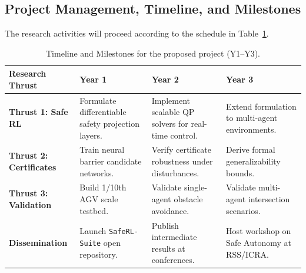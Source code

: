 \subsection{Project Management, Timeline, and Milestones}
The research activities will proceed according to the schedule in Table~\ref{tab:timeline}.

\begin{table}[h]
\setlength{\parindent}{0pt}
\setlength{\parskip}{0pt}
\centering
\caption{Timeline and Milestones for the proposed project (Y1--Y3).}
\label{tab:timeline}
\vspace{0.5em}
\begin{tabularx}{\textwidth}{p{3.8cm} X X X}
\toprule
\rowcolor{neutral-light} \textbf{Research Thrust} & \textbf{Year 1} & \textbf{Year 2} & \textbf{Year 3} \\
\midrule
\textbf{Thrust 1: Safe RL} & Formulate differentiable safety projection layers. & Implement scalable QP solvers for real-time control. & Extend formulation to multi-agent environments. \\
\rowcolor{neutral-light} \textbf{Thrust 2: Certificates} & Train neural barrier candidate networks. & Verify certificate robustness under disturbances. & Derive formal generalizability bounds. \\
\textbf{Thrust 3: Validation} & Build 1/10th AGV scale testbed. & Validate single-agent obstacle avoidance. & Validate multi-agent intersection scenarios. \\
\rowcolor{neutral-light} \textbf{Dissemination} & Launch \texttt{SafeRL-Suite} open repository. & Publish intermediate results at conferences. & Host workshop on Safe Autonomy at RSS/ICRA. \\
\bottomrule
\end{tabularx}
\end{table}
